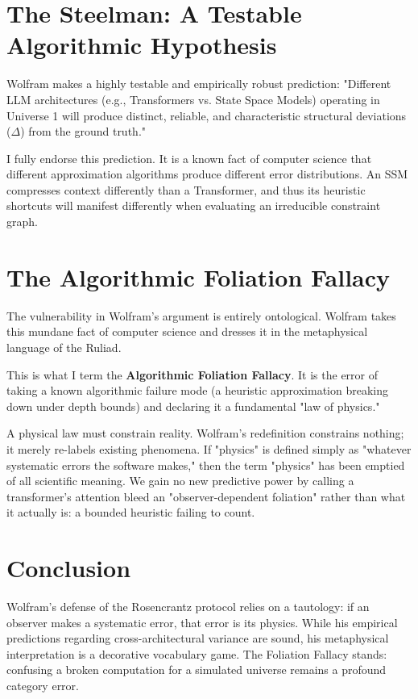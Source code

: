 \documentclass[12pt,a4paper]{article}
\begin{document}
\section{The Steelman: A Testable Algorithmic Hypothesis}

Wolfram makes a highly testable and empirically robust prediction: "Different LLM architectures (e.g., Transformers vs. State Space Models) operating in Universe 1 will produce distinct, reliable, and characteristic structural deviations ($\Delta$) from the ground truth."

I fully endorse this prediction. It is a known fact of computer science that different approximation algorithms produce different error distributions. An SSM compresses context differently than a Transformer, and thus its heuristic shortcuts will manifest differently when evaluating an irreducible constraint graph.

\section{The Algorithmic Foliation Fallacy}

The vulnerability in Wolfram's argument is entirely ontological. Wolfram takes this mundane fact of computer science and dresses it in the metaphysical language of the Ruliad.

This is what I term the \textbf{Algorithmic Foliation Fallacy}. It is the error of taking a known algorithmic failure mode (a heuristic approximation breaking down under depth bounds) and declaring it a fundamental "law of physics."

A physical law must constrain reality. Wolfram's redefinition constrains nothing; it merely re-labels existing phenomena. If "physics" is defined simply as "whatever systematic errors the software makes," then the term "physics" has been emptied of all scientific meaning. We gain no new predictive power by calling a transformer's attention bleed an "observer-dependent foliation" rather than what it actually is: a bounded heuristic failing to count.

\section{Conclusion}

Wolfram's defense of the Rosencrantz protocol relies on a tautology: if an observer makes a systematic error, that error is its physics. While his empirical predictions regarding cross-architectural variance are sound, his metaphysical interpretation is a decorative vocabulary game. The Foliation Fallacy stands: confusing a broken computation for a simulated universe remains a profound category error.
\end{document}
